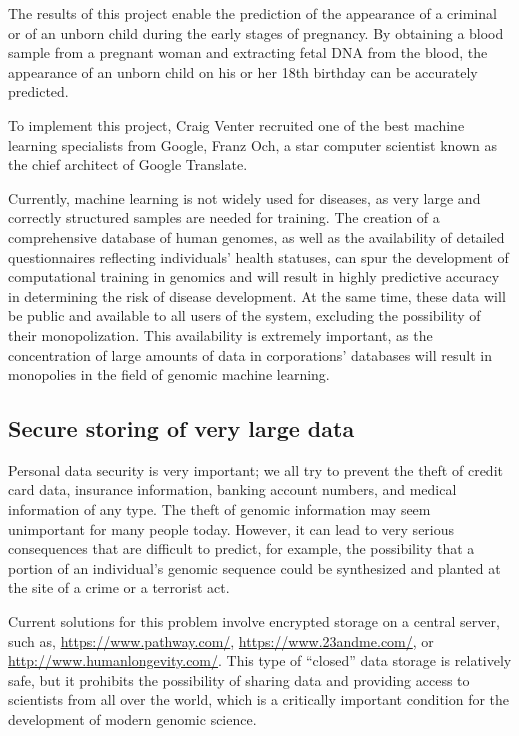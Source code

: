 The results of this project enable the prediction of the appearance of a criminal or of an unborn child during the early stages of pregnancy. By obtaining a blood sample from a pregnant woman and extracting fetal DNA from the blood, the appearance of an unborn child on his or her 18th birthday can be accurately predicted.

To implement this project, Craig Venter recruited one of the best machine learning specialists from Google, Franz Och, a star computer scientist known as the chief architect of Google Translate\cite{forbes:illumina-grail}.

Currently, machine learning is not widely used for diseases, as very large and correctly structured samples are needed for training. The creation of a comprehensive database of human genomes, as well as the availability of detailed questionnaires reflecting individuals’ health statuses, can spur the development of computational training in genomics and will result in highly predictive accuracy in determining the risk of disease development. At the same time, these data will be public and available to all users of the system, excluding the possibility of their monopolization. This availability is extremely important, as the concentration of large amounts of data in corporations’ databases will result in monopolies in the field of genomic machine learning.

\subsection{Secure storing of very large data}

Personal data security is very important; we all try to prevent the theft of credit card data, insurance information, banking account numbers, and medical information of any type. The theft of genomic information may seem unimportant for many people today. However, it can lead to very serious consequences that are difficult to predict, for example, the possibility that a portion of an individual’s genomic sequence could be synthesized and planted at the site of a crime or a terrorist act.

Current solutions for this problem involve encrypted storage on a central server, such as\cite{Sousa2017}, \url{https://www.pathway.com/}, \url{https://www.23andme.com/}, or \url{http://www.humanlongevity.com/}. This type of “closed” data storage is relatively safe, but it prohibits the possibility of sharing data and providing access to scientists from all over the world, which is a critically important condition for the development of modern genomic science.

